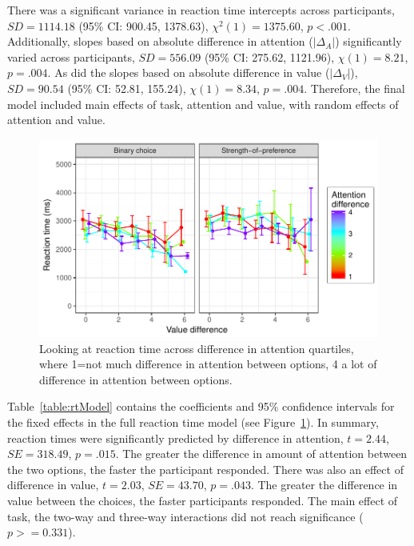 \documentclass[12pt]{article}
\begin{document}


There was a significant variance in reaction time intercepts across participants, $SD=1114.18$ (95\% CI: 900.45, 1378.63), $\chi^2(1)=1375.60$, $p<.001$. Additionally, slopes based on absolute difference in attention ($|\Delta_A|$) significantly varied across participants, $SD=556.09$ (95\% CI: 275.62, 1121.96), $\chi(1)=8.21$, $p=.004$. As did the slopes based on absolute difference in value ($|\Delta_V|$), $SD=90.54$ (95\% CI: 52.81, 155.24), $\chi(1)=8.34$, $p=.004$. Therefore, the final model included main effects of task, attention and value, with random effects of attention and value. 

\begin{figure}[b!]
	\centering
	\includegraphics{images/RTattentionValueGraph}
	\caption{Looking at reaction time across difference in attention quartiles, where 1=not much difference in attention between options, 4 a lot of difference in attention between options.}
	\label{figure:RTattentionValueGraph}
\end{figure}

Table~\ref{table:rtModel} contains the coefficients and 95\% confidence intervals for the fixed effects in the full reaction time model (see Figure~\ref{figure:RTattentionValueGraph}). In summary, reaction times were significantly predicted by difference in attention, $t=2.44$, $SE=318.49$, $p=.015$. The greater the difference in amount of attention between the two options, the faster the participant responded. There was also an effect of difference in value, $t=2.03$, $SE=43.70$, $p=.043$. The greater the difference in value between the choices, the faster participants responded. The main effect of task, the two-way and three-way interactions did not reach significance ($p>=0.331$). 
\end{document}
